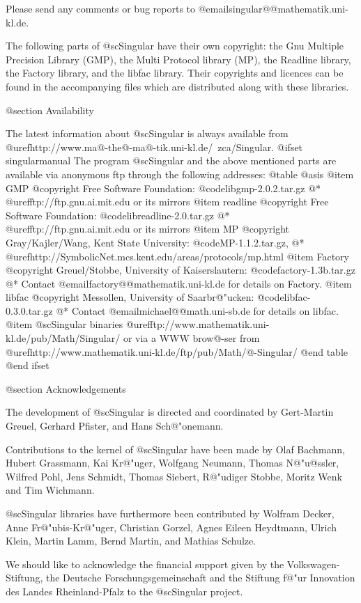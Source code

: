 Please send any comments or bug reports to
@email{singular@@mathematik.uni-kl.de}.

The following parts of @sc{Singular} have their own copyright: the Gnu Multiple
Precision Library (GMP), the Multi Protocol library (MP), the Readline library,
the Factory library, and the libfac library.
Their copyrights and licences can be found in the accompanying files
which are distributed along with these libraries.

@section Availability

The latest information about @sc{Singular} is always available from
@uref{http://www.ma@-the@-ma@-tik.uni-kl.de/~zca/Singular}.
@ifset singularmanual
The program @sc{Singular} and the above mentioned parts are available via
anonymous ftp through the following addresses:
@table @asis
@item GMP
@copyright{} Free Software Foundation:
@code{libgmp-2.0.2.tar.gz}
@* @uref{ftp://ftp.gnu.ai.mit.edu} or its mirrors
@item readline
@copyright{} Free Software Foundation:
@code{libreadline-2.0.tar.gz}
@* @uref{ftp://ftp.gnu.ai.mit.edu} or its mirrors
@item MP
@copyright{} Gray/Kajler/Wang, Kent State University:
@code{MP-1.1.2.tar.gz},
@* @uref{http://SymbolicNet.mcs.kent.edu/areas/protocols/mp.html}
@item Factory
@copyright{} Greuel/Stobbe, University of Kaiserslautern:
@code{factory-1.3b.tar.gz}
@* Contact @email{factory@@mathematik.uni-kl.de} for details on Factory.
@item libfac
@copyright{}  Messollen, University of
Saarbr@"ucken:
@code{libfac-0.3.0.tar.gz}
@* Contact @email{michael@@math.uni-sb.de} for details on libfac.
@item @sc{Singular} binaries
@uref{ftp://www.mathematik.uni-kl.de/pub/Math/Singular/} or via a
WWW brow@-ser from
@uref{http://www.mathematik.uni-kl.de/ftp/pub/Math/@-Singular/}
@end table
@end ifset

@section Acknowledgements

The development of @sc{Singular} is directed and coordinated by
Gert-Martin Greuel, Gerhard Pfister, and Hans
Sch@"onemann.

Contributions to the kernel of @sc{Singular} have been made by
Olaf Bachmann,
Hubert Grassmann,
Kai Kr@"uger,
Wolfgang Neumann,
Thomas N@"u@ss{}ler,
Wilfred Pohl,
Jens Schmidt,
Thomas Siebert,
R@"udiger Stobbe,
Moritz Wenk
and
Tim Wichmann.

@sc{Singular} libraries have furthermore been contributed by
Wolfram Decker,
Anne Fr@"ubis-Kr@"uger,
Christian Gorzel,
Agnes Eileen Heydtmann,
Ulrich Klein,
Martin Lamm,
Bernd Martin,
and
Mathias Schulze.

We should like to acknowledge the financial support given by
the Volkswagen-Stiftung,
the Deutsche Forschungsgemeinschaft
and the Stiftung f@"ur Innovation des Landes Rheinland-Pfalz
to the @sc{Singular} project.

